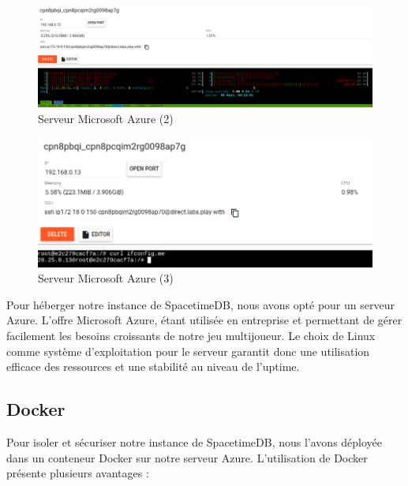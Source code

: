 \documentclass[
	article,			%
	11pt,				%
	oneside,			%
	a4paper,			%
	chapter=TITLE,
	french,			%
	sumario=tradicional
	]{base_nt}
\begin{document}
\newpage

\begin{figure}[ht]
	\caption{Serveur Microsoft Azure (2)}
	\centering
	\includegraphics[width=1\linewidth]{paper28.png}
	\legend{}
	
\end{figure}

\begin{figure}[ht]
	\caption{Serveur Microsoft Azure (3)}
	\centering
	\includegraphics[width=1\linewidth]{paper29.png}
	\legend{}
	
\end{figure}

Pour héberger notre instance de SpacetimeDB, nous avons opté pour un serveur Azure. L'offre Microsoft Azure, étant utilisée en entreprise et permettant de gérer facilement les besoins croissants de notre jeu multijoueur. Le choix de Linux comme système d'exploitation pour le serveur garantit donc une utilisation efficace des ressources et une stabilité au niveau de l'uptime.

\newpage

\subsection{Docker}

Pour isoler et sécuriser notre instance de SpacetimeDB, nous l'avons déployée dans un conteneur Docker sur notre serveur Azure. L'utilisation de Docker présente plusieurs avantages :
\end{document}
